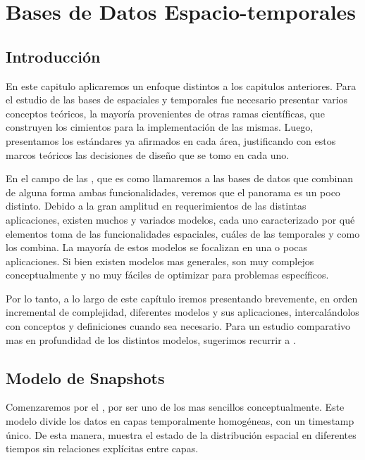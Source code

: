 \chapter{Bases de Datos Espacio-temporales}  \label{cap:et}

\section{Introducción} \label{sec:st:intro}

En este capitulo aplicaremos un enfoque distintos a los capitulos anteriores.
Para el estudio de las bases de espaciales y temporales fue necesario presentar varios conceptos teóricos,
la mayoría provenientes de otras ramas científicas,
que construyen los cimientos para la implementación de las mismas.
Luego, presentamos los estándares ya afirmados en cada área,
justificando con estos marcos teóricos las decisiones de diseño que se tomo en cada uno.

En el campo de las ,
que es como llamaremos a las bases de datos que combinan de alguna forma ambas funcionalidades,
veremos que el panorama es un poco distinto.
Debido a la gran amplitud en requerimientos de las distintas aplicaciones,
existen muchos y variados modelos, cada uno caracterizado por
qué elementos toma de las funcionalidades espaciales, cuáles de las temporales y como los combina.
La mayoría de estos modelos se focalizan en una o pocas aplicaciones.
Si bien existen modelos mas generales, son muy complejos conceptualmente
y no muy fáciles de optimizar para problemas específicos.

Por lo tanto, a lo largo de este capítulo iremos presentando brevemente, en orden incremental de complejidad,
diferentes modelos y sus aplicaciones, intercalándolos con conceptos y definiciones cuando sea necesario.
Para un estudio comparativo mas en profundidad de los distintos modelos, sugerimos recurrir a \cite{sp:litreview}.

\section{Modelo de Snapshots}

Comenzaremos por el \textsuperscript{\cite{sp:snapshot}}, por ser uno de los mas sencillos conceptualmente.
Este modelo divide los datos en capas temporalmente homogéneas, con un timestamp único.
De esta manera, muestra el estado de la distribución espacial en diferentes tiempos sin relaciones explícitas entre capas.


